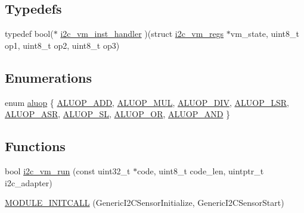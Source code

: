 \subsection*{\-Typedefs}
\begin{DoxyCompactItemize}
\item 
typedef bool($\ast$ \hyperlink{group___generic_i2_c_sensor_gadf40759a617bda9fd99790f2c1f2699a}{i2c\-\_\-vm\-\_\-inst\-\_\-handler} )(struct \hyperlink{structi2c__vm__regs}{i2c\-\_\-vm\-\_\-regs} $\ast$vm\-\_\-state, uint8\-\_\-t op1, uint8\-\_\-t op2, uint8\-\_\-t op3)
\end{DoxyCompactItemize}
\subsection*{\-Enumerations}
\begin{DoxyCompactItemize}
\item 
enum \hyperlink{group___generic_i2_c_sensor_ga2ee1b0064ef2db1498ae8fb59548a865}{aluop} \{ \*
\hyperlink{group___generic_i2_c_sensor_gga2ee1b0064ef2db1498ae8fb59548a865a6f9ecf7290283d4ac27f9a224c8febfb}{\-A\-L\-U\-O\-P\-\_\-\-A\-D\-D}, 
\hyperlink{group___generic_i2_c_sensor_gga2ee1b0064ef2db1498ae8fb59548a865afee8d68922e487fd5b9b01249cd56627}{\-A\-L\-U\-O\-P\-\_\-\-M\-U\-L}, 
\hyperlink{group___generic_i2_c_sensor_gga2ee1b0064ef2db1498ae8fb59548a865abaeb37672e28ae72847ae16ea28b5edd}{\-A\-L\-U\-O\-P\-\_\-\-D\-I\-V}, 
\hyperlink{group___generic_i2_c_sensor_gga2ee1b0064ef2db1498ae8fb59548a865acc28a270f52a75a1531f9aaef6e61493}{\-A\-L\-U\-O\-P\-\_\-\-L\-S\-R}, 
\*
\hyperlink{group___generic_i2_c_sensor_gga2ee1b0064ef2db1498ae8fb59548a865a90db6aa1f2728dc8d7117cb705930333}{\-A\-L\-U\-O\-P\-\_\-\-A\-S\-R}, 
\hyperlink{group___generic_i2_c_sensor_gga2ee1b0064ef2db1498ae8fb59548a865a44b5db26a65333ca2c370a7e422d6d34}{\-A\-L\-U\-O\-P\-\_\-\-S\-L}, 
\hyperlink{group___generic_i2_c_sensor_gga2ee1b0064ef2db1498ae8fb59548a865ab11994f2dbe833ede0ee1ad55b40a041}{\-A\-L\-U\-O\-P\-\_\-\-O\-R}, 
\hyperlink{group___generic_i2_c_sensor_gga2ee1b0064ef2db1498ae8fb59548a865a9bac7bd2748699ab1efd293a4f559914}{\-A\-L\-U\-O\-P\-\_\-\-A\-N\-D}
 \}
\end{DoxyCompactItemize}
\subsection*{\-Functions}
\begin{DoxyCompactItemize}
\item 
bool \hyperlink{group___generic_i2_c_sensor_ga25fa33f408947a8b6015181705441220}{i2c\-\_\-vm\-\_\-run} (const uint32\-\_\-t $\ast$code, uint8\-\_\-t code\-\_\-len, uintptr\-\_\-t i2c\-\_\-adapter)
\item 
\hyperlink{group___generic_i2_c_sensor_ga344f2789d858becc085f5bc8f16a7290}{\-M\-O\-D\-U\-L\-E\-\_\-\-I\-N\-I\-T\-C\-A\-L\-L} (\-Generic\-I2\-C\-Sensor\-Initialize, \-Generic\-I2\-C\-Sensor\-Start)
\end{DoxyCompactItemize}
